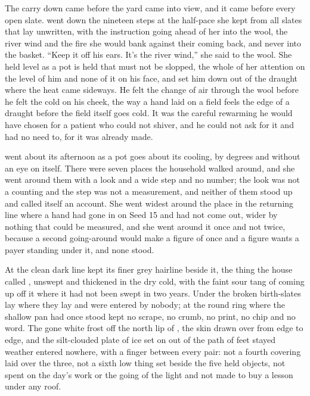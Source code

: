 The carry down came before the yard came into view, and it came before every open slate.  went down the nineteen steps at the half-pace she kept from all slates that lay unwritten, with the instruction going ahead of her into the wool, the river wind and the fire she would bank against their coming back, and never into the basket. “Keep it off his ears. It's the river wind,” she said to the wool. She held  level as a pot is held that must not be slopped, the whole of her attention on the level of him and none of it on his face, and set him down out of the draught where the heat came sideways. He felt the change of air through the wool before he felt the cold on his cheek, the way a hand laid on a field feels the edge of a draught before the field itself goes cold. It was the careful rewarming he would have chosen for a patient who could not shiver, and he could not ask for it and had no need to, for it was already made.

 went about its afternoon as a pot goes about its cooling, by degrees and without an eye on itself. There were seven places the household walked around, and she went around them with a look and a wide step and no number; the look was not a counting and the step was not a measurement, and neither of them stood up and called itself an account. She went widest around the place in the returning line where a hand had gone in on Seed 15 and had not come out, wider by nothing that could be measured, and she went around it once and not twice, because a second going-around would make a figure of once and a figure wants a payer standing under it, and none stood.

At  the clean dark line kept its finer grey hairline beside it, the thing the house called , unswept and thickened in the dry cold, with the faint sour tang of  coming up off it where it had not been swept in two years. Under  the broken birth-slates lay where they lay and were entered by nobody; at  the round ring where the shallow pan had once stood kept no scrape, no crumb, no print, no chip and no word. The gone white frost off the north lip of , the skin drawn over  from edge to edge, and the silt-clouded plate of ice set on  out of the path of feet stayed weather entered nowhere, with a finger between every pair: not a fourth covering laid over the three, not a sixth low thing set beside the five held objects, not spent on the day's work or the going of the light and not made to buy a lesson under any roof.

